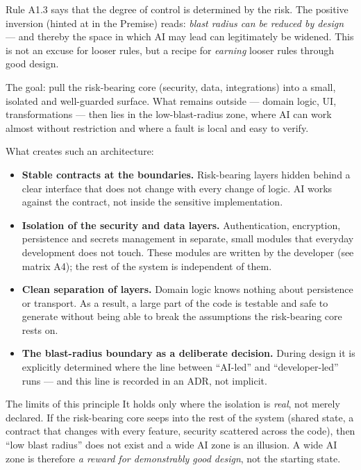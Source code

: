 Rule A1.3 says that the degree of control is determined by the risk.
The positive inversion (hinted at in the Premise) reads: \emph{blast radius can be reduced by design} --- and thereby the space in which AI may lead can legitimately be widened.
This is not an excuse for looser rules, but a recipe for \emph{earning} looser rules through good design.

\begin{calloutplain}[green]
The goal: pull the risk-bearing core (security, data, integrations) into a small, isolated and well-guarded surface.
What remains outside --- domain logic, UI, transformations --- then lies in the low-blast-radius zone, where AI can work almost without restriction and where a fault is local and easy to verify.
\end{calloutplain}

\medskip
What creates such an architecture:

\begin{itemize}
\item \textbf{Stable contracts at the boundaries.}
Risk-bearing layers hidden behind a clear interface that does not change with every change of logic.
AI works against the contract, not inside the sensitive implementation.
\item \textbf{Isolation of the security and data layers.}
Authentication, encryption, persistence and secrets management in separate, small modules that everyday development does not touch.
These modules are written by the developer (see matrix A4); the rest of the system is independent of them.
\item \textbf{Clean separation of layers.}
Domain logic knows nothing about persistence or transport.
As a result, a large part of the code is testable and safe to generate without being able to break the assumptions the risk-bearing core rests on.
\item \textbf{The blast-radius boundary as a deliberate decision.}
During design it is explicitly determined where the line between \enquote{AI-led} and \enquote{developer-led} runs --- and this line is recorded in an ADR, not implicit.
\end{itemize}

\begin{callout}[amber]{The limits of this principle}
It holds only where the isolation is \emph{real}, not merely declared.
If the risk-bearing core seeps into the rest of the system (shared state, a contract that changes with every feature, security scattered across the code), then \enquote{low blast radius} does not exist and a wide AI zone is an illusion.
A wide AI zone is therefore \emph{a reward for demonstrably good design}, not the starting state.
\end{callout}

